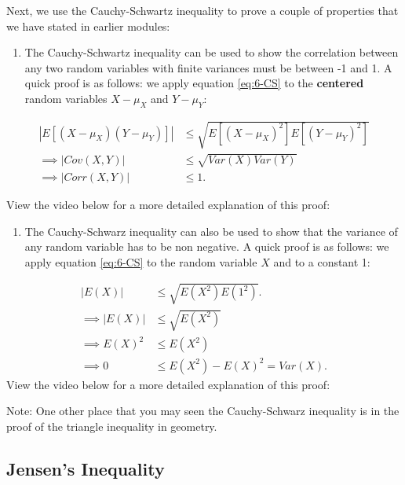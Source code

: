 \documentclass[
]{book}
\providecommand{\tightlist}{%
  \setlength{\itemsep}{0pt}\setlength{\parskip}{0pt}}
\begin{document}
Next, we use the Cauchy-Schwartz inequality to prove a couple of properties that we have stated in earlier modules:

\begin{enumerate}
\def\labelenumi{\arabic{enumi}.}
\tightlist
\item
  The Cauchy-Schwartz inequality can be used to show the correlation between any two random variables with finite variances must be between -1 and 1. A quick proof is as follows: we apply equation \eqref{eq:6-CS} to the \textbf{centered} random variables \(X - \mu_X\) and \(Y - \mu_Y\):
\end{enumerate}

\[
\begin{split}
|E[(X - \mu_X)(Y - \mu_Y)]| & \leq \sqrt{E[(X - \mu_X)^2] E[(Y - \mu_Y)^2]} \\
\implies |Cov(X,Y)| & \leq \sqrt{Var(X) Var(Y)} \\
\implies |Corr(X,Y)| & \leq 1.
\end{split}
\]

View the video below for a more detailed explanation of this proof:

\begin{enumerate}
\def\labelenumi{\arabic{enumi}.}
\setcounter{enumi}{1}
\tightlist
\item
  The Cauchy-Schwarz inequality can also be used to show that the variance of any random variable has to be non negative. A quick proof is as follows: we apply equation \eqref{eq:6-CS} to the random variable \(X\) and to a constant 1:
\end{enumerate}

\[
\begin{split}
|E(X)| & \leq \sqrt{E(X^2)E(1^2)}. \\
\implies |E(X)| & \leq \sqrt{E(X^2)} \\
\implies E(X)^2 & \leq E(X^2) \\
\implies 0 & \leq E(X^2) - E(X)^2 = Var(X).
\end{split}
\]
View the video below for a more detailed explanation of this proof:

Note: One other place that you may seen the Cauchy-Schwarz inequality is in the proof of the triangle inequality in geometry.

\hypertarget{jensens-inequality}{%
\subsection{Jensen's Inequality}\label{jensens-inequality}}
\end{document}
